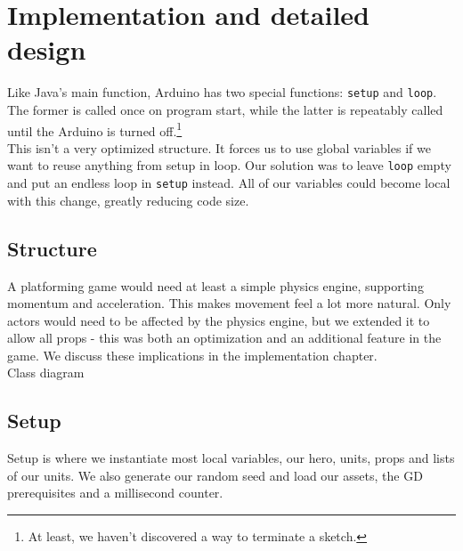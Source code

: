 \chapter{Implementation and detailed design} %
Like Java's main function, Arduino has two special functions: {\tt setup} and {\tt loop}. The former is called once on program start, while the latter is repeatably called until the Arduino is turned off.\footnote{At least, we haven't discovered a way to terminate a sketch.}\\
This isn't a very optimized structure. It forces us to use global variables if we want to reuse anything from setup in loop. Our solution was to leave {\tt loop} empty and put an endless loop in {\tt setup} instead. All of our variables could become local with this change, greatly reducing code size.\\

\section{Structure}
A platforming game would need at least a simple physics engine, supporting momentum and acceleration. This makes movement feel a lot more natural. Only actors would need to be affected by the physics engine, but we extended it to allow all props - this was both an optimization and an additional feature in the game. We discuss these implications in the implementation chapter.\\
Class diagram

\section{Setup}
Setup is where we instantiate most local variables, our hero, units, props and lists of our units. We also generate our random seed and load our assets, the GD prerequisites and a millisecond counter.

